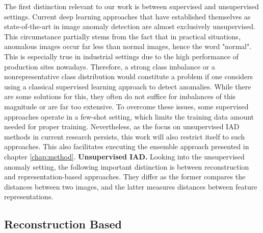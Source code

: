 The first distinction relevant to our work is between supervised and unsupervised settings. Current deep learning approaches that have established themselves as state-of-the-art in image anomaly detection 
are almost exclusively unsupervised. This circumstance partially stems from the fact 
that in practical situations, anomalous images occur far less than normal images, hence the word "normal". This is especially true in industrial settings due to the high performance of 
production sites nowadays. Therefore, a strong class imbalance or a nonrepresentative class 
distribution would constitute a problem if one considers using a classical supervised learning approach to detect anomalies. While there are some solutions for this, they often do not suffice for imbalances of this magnitude or are far too extensive. To overcome 
these issues, some supervised approaches \cite{Chu_2020supervised} operate in a few-shot setting, which limits the training data amount needed for proper training. Nevertheless, as the focus on 
unsupervised IAD methods in current research persists, 
this work will also restrict itself to such approaches. This also facilitates executing the ensemble approach presented in chapter \ref{chap:method}.
\newline
\textbf{Unsupervised IAD.} Looking into the unsupervised anomaly setting, the following important distinction is between reconstruction and representation-based approaches. They differ as the former compares the distances between two images, and the latter measures distances between feature representations.

\subsection{Reconstruction Based}

